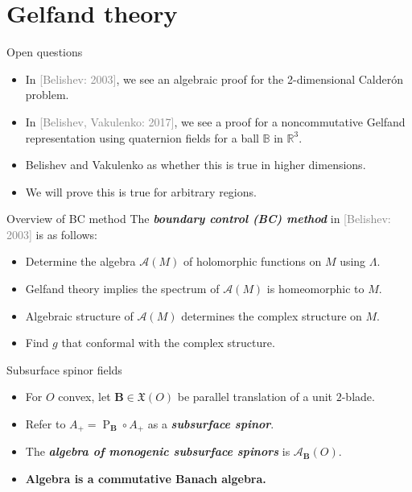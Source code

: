\documentclass[aspectratio=169,handout]{beamer}
\newcommand\boldgreen[1]{\textcolor{lighter_csu_green}{\emph{\textbf{#1}}}}
\newcommand\boldgold[1]{\textcolor{csu_gold}{\textbf{#1}}}
\newcommand\grey[1]{\textcolor{gray}{#1}}
\newcommand{\R}{\mathbb{R}}
\newcommand{\algebra}{\mathcal{A}}
\newcommand{\ball}{\mathbb{B}}
\newcommand{\projection}{\operatorname{P}}
\newcommand{\blade}[1]{\boldsymbol{#1}}
\newcommand{\bivector}{\blade{B}}
\newcommand{\smoothfields}{\mathfrak{X}}
\begin{document}
\section{Gelfand theory}

\begin{frame}{Open questions}
\vfill
\begin{itemize}
\pause
    \item In \grey{[Belishev: 2003]}, we see an algebraic proof for the 2-dimensional Calder\'on problem.
\pause
    \item In \grey{[Belishev, Vakulenko: 2017]}, we see a proof for a noncommutative Gelfand representation using quaternion fields for a ball $\ball$ in $\R^3$.
\pause
    \item Belishev and Vakulenko as whether this is true in higher dimensions.
\pause
    \item We will prove this is true for arbitrary regions.
\end{itemize}
\vfill
\end{frame}

\begin{frame}{Overview of BC method}
\vfill
The \boldgreen{boundary control (BC) method} in \grey{[Belishev: 2003]} is as follows:
\begin{itemize}
    \pause
    \item Determine the algebra $\algebra{}(M)$ of holomorphic functions on $M$ using $\Lambda$.
    \pause
    \item Gelfand theory implies the spectrum of $\algebra{}(M)$ is homeomorphic to $M$.
    \pause
    \item Algebraic structure of $\algebra{}(M)$ determines the complex structure on $M$.
    \pause
    \item Find $g$ that conformal with the complex structure.
\end{itemize}
\vfill
\end{frame}

\begin{frame}{Subsurface spinor fields}
\vfill
\begin{itemize}
\pause
\item For $O$ convex, let $\bivector \in \smoothfields(O)$ be parallel translation of a unit $2$-blade.
\pause
\item Refer to $A_+ = \projection_{\bivector} \circ A_+$ as a \boldgreen{subsurface spinor}.
\pause
\end{itemize}
\begin{figure}[H]
    \centering
    \def\svgwidth{0.3\columnwidth}
\resizebox{.25\textwidth}{!}{}
\end{figure}
\begin{itemize}
\item The \boldgreen{algebra of monogenic subsurface spinors} is $\algebra_{\bivector}(O)$.
\pause
\item \boldgold{Algebra is a commutative Banach algebra.}
\end{itemize}
\vfill
\end{frame}
\end{document}
